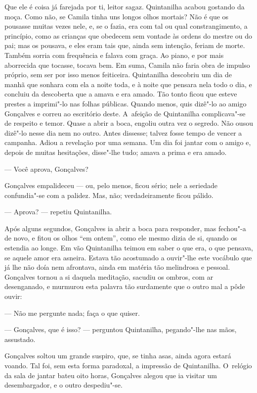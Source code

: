 \begin{linenumbers}
Que ele é coisa já farejada por ti, leitor sagaz. Quintanilha acabou
gostando da moça. Como não, se Camila tinha uns longos olhos mortais?
Não é que os pousasse muitas vezes nele, e, se o fazia, era com tal ou
qual constrangimento, a princípio, como as crianças que obedecem sem
vontade às ordens do mestre ou do pai; mas os pousava, e eles eram tais
que, ainda sem intenção, feriam de morte. Também sorria com frequência e
falava com graça. Ao piano, e por mais aborrecida que tocasse, tocava
bem. Em suma, Camila não faria obra de impulso próprio, sem ser por isso
menos feiticeira. Quintanilha descobriu um dia de manhã que sonhara com
ela a noite toda, e à noite que pensara nela todo o dia, e concluiu da
descoberta que a amava e era amado. Tão tonto ficou que esteve prestes a
imprimi"-lo nas folhas públicas. Quando menos, quis dizê"-lo ao amigo
Gonçalves e correu ao escritório deste. A~afeição de Quintanilha
complicava"-se de respeito e temor. Quase a abrir a boca, engoliu outra
vez o segredo. Não ousou dizê"-lo nesse dia nem no outro. Antes dissesse;
talvez fosse tempo de vencer a campanha. Adiou a revelação por uma
semana. Um dia foi jantar com o amigo e, depois de muitas hesitações,
disse"-lhe tudo; amava a prima e era amado.

--- Você aprova, Gonçalves?

Gonçalves empalideceu --- ou, pelo menos, ficou sério; nele a seriedade
confundia"-se com a palidez. Mas, não; verdadeiramente ficou pálido.

--- Aprova? --- repetiu Quintanilha.

Após alguns segundos, Gonçalves ia abrir a boca para responder, mas
fechou"-a de novo, e fitou os olhos ``em ontem'', como ele mesmo dizia de
si, quando os estendia ao longe. Em vão Quintanilha teimou em saber o
que era, o que pensava, se aquele amor era asneira. Estava tão
acostumado a ouvir"-lhe este vocábulo que já lhe não doía nem afrontava,
ainda em matéria tão melindrosa e pessoal. Gonçalves tornou a si daquela
meditação, sacudiu os ombros, com ar desenganado, e murmurou esta
palavra tão surdamente que o outro mal a pôde ouvir:

--- Não me pergunte nada; faça o que quiser.

--- Gonçalves, que é isso? --- perguntou Quintanilha, pegando"-lhe nas
mãos, assustado.

Gonçalves soltou um grande suspiro, que, se tinha asas, ainda agora
estará voando. Tal foi, sem esta forma paradoxal, a impressão de
Quintanilha. O~relógio da sala de jantar bateu oito horas, Gonçalves
alegou que ia visitar um desembargador, e o outro despediu"-se.


\end{linenumbers}
